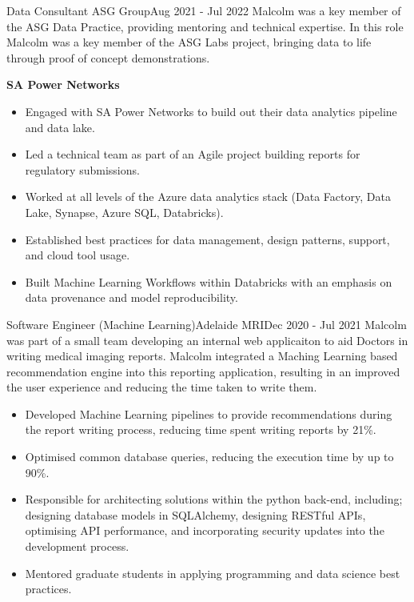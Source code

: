 \begin{cventry}{Data Consultant} {ASG Group}{}{Aug 2021 - Jul 2022}
  Malcolm was a key member of the ASG Data Practice,
  providing mentoring and technical expertise.
  In this role Malcolm was a key member of the ASG Labs project, 
  bringing data to life through proof of concept demonstrations.

  \textbf{SA Power Networks}

  \begin{itemize}
    \item Engaged with SA Power Networks to build out their data analytics pipeline and data lake.
    \item Led a technical team as part of an Agile project building reports for regulatory submissions.
    \item Worked at all levels of the Azure data analytics stack (Data Factory, Data Lake, Synapse, Azure SQL, Databricks).
    \item Established best practices for data management, design patterns, support, and cloud tool usage.
    \item Built Machine Learning Workflows within Databricks with an emphasis on data provenance and model reproducibility.
  \end{itemize}

\end{cventry}

\pagebreak
\begin{cventry}{Software Engineer (Machine Learning)}{Adelaide MRI}{}{Dec 2020 - Jul 2021}
  Malcolm was part of a small team developing an internal web applicaiton
  to aid Doctors in writing medical imaging reports.
  Malcolm integrated a Maching Learning based recommendation engine
  into this reporting application,
  resulting in an improved the user experience and
  reducing the time taken to write them. 
  \begin{itemize}
    \item Developed Machine Learning pipelines to provide recommendations
      during the report writing process, reducing time spent
      writing reports by 21\%.
    \item Optimised common database queries, reducing the execution time by
      up to 90\%.
    \item Responsible for architecting solutions
      within the python back-end, including;
      designing database models in SQLAlchemy,
      designing RESTful APIs,
      optimising API performance,
      and incorporating security updates into the development process.
    \item Mentored graduate students in applying programming and data science
      best practices.
  \end{itemize}
\end{cventry}

